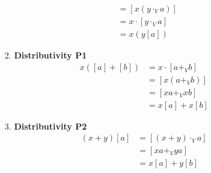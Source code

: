 \documentclass[12pt]{article}
\begin{document}
\begin{enumerate}
\begin{enumerate}
\begin{enumerate}[label=\arabic*]
\begin{align*}
                                          & =[x(y \cdot_V a)]      \\
                                          & =x \cdot [y \cdot_V a] \\
                                          & =x(y[a])
                              \end{align*}
                        \item \textbf{Distributivity P1}
                              \begin{align*}
                                  x([a]+[b]) & =x \cdot [a +_V b] \\
                                             & =[x(a +_V b)]      \\
                                             & =[xa +_V xb]       \\
                                             & =x[a]+x[b]
                              \end{align*}
                        \item \textbf{Distributivity P2}
                              \begin{align*}
                                  (x+y)[a] & =[(x+y) \cdot_V a] \\
                                           & =[xa +_V ya]       \\
                                           & =x[a]+y[b]
                              \end{align*}
                    \end{enumerate}
          \end{enumerate}
\end{enumerate}
\end{document}
